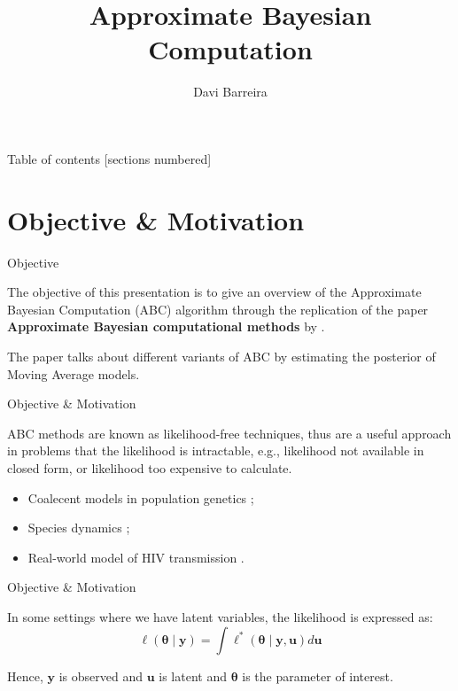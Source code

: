 \documentclass[10pt]{beamer}
\title{Approximate Bayesian Computation}
\subtitle{}
\date{}
\author{Davi Barreira}
\institute{FGV - Escola de Matemática Aplicada}
\begin{document}
\maketitle

\begin{frame}{Table of contents}
  [sections numbered]
  \tableofcontents[hideallsubsections]
\end{frame}

\AtBeginSection{}
\section[Objective Motivation]{Objective \& Motivation}
\begin{frame}[fragile]{Objective}

  The objective of this presentation is to give an overview of
  the Approximate Bayesian Computation (ABC) algorithm through the
  replication of the
  paper \textbf{Approximate Bayesian computational methods} by
  \cite{Marin2012}.

  The paper talks about different variants of ABC by estimating the
  posterior of Moving Average models.

\end{frame}

\begin{frame}[fragile]{Objective \& Motivation}

  ABC methods are known as likelihood-free techniques, thus are
  a useful approach in problems that the likelihood is intractable, e.g., likelihood not available in
  closed form, or likelihood too expensive to calculate.
  \begin{itemize}
    \item Coalecent models in population genetics \citep{Tavare505};
    \item Species dynamics \citep{Jabot2016};
    \item Real-world model of HIV transmission \citep{McKinley2018}.
  \end{itemize}

\end{frame}

\begin{frame}[fragile]{Objective \& Motivation}

  In some settings where we have latent variables, the likelihood is
  expressed as:
  $$\ell(\bm\theta \mid \bm y) =
  \bm\int \ell^*(\bm\theta \mid \bm y, \bm u) d\bm u$$

  Hence, $\bm y$ is observed and $\bm u$ is latent and $\bm\theta$
  is the parameter of interest.

\end{frame}
\end{document}
